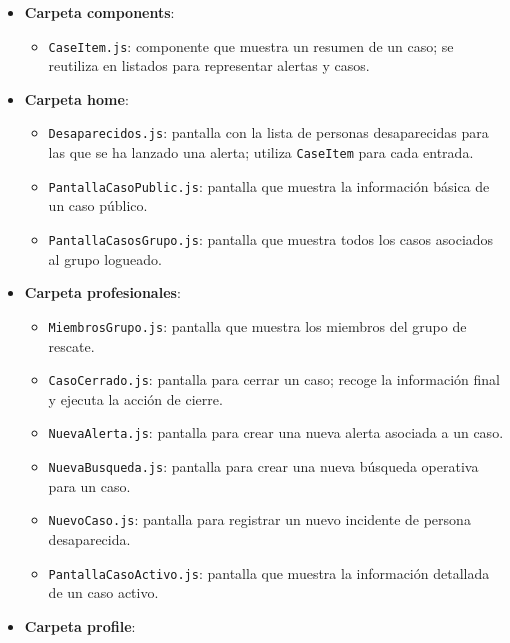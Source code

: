 \begin{itemize}
\begin{itemize}
\begin{itemize}
\begin{itemize}
\begin{itemize}
\begin{itemize}
                    \end{itemize}
                    \item \textbf{Carpeta components}:
                    \begin{itemize}
                        \item \texttt{CaseItem.js}: componente que muestra un resumen de un caso; se reutiliza en listados para representar alertas y casos.
                    \end{itemize}
                    \item \textbf{Carpeta home}:
                    \begin{itemize}
                        \item \texttt{Desaparecidos.js}: pantalla con la lista de personas desaparecidas para las que se ha lanzado una alerta; utiliza \texttt{CaseItem} para cada entrada.
                        \item \texttt{PantallaCasoPublic.js}: pantalla que muestra la información básica de un caso público.
                        \item \texttt{PantallaCasosGrupo.js}: pantalla que muestra todos los casos asociados al grupo logueado.
                    \end{itemize}
                    \item \textbf{Carpeta profesionales}:
                    \begin{itemize}
                        \item \texttt{MiembrosGrupo.js}: pantalla que muestra los miembros del grupo de rescate.
                        \item \texttt{CasoCerrado.js}: pantalla para cerrar un caso; recoge la información final y ejecuta la acción de cierre.
                        \item \texttt{NuevaAlerta.js}: pantalla para crear una nueva alerta asociada a un caso.
                        \item \texttt{NuevaBusqueda.js}: pantalla para crear una nueva búsqueda operativa para un caso.
                        \item \texttt{NuevoCaso.js}: pantalla para registrar un nuevo incidente de persona desaparecida.
                        \item \texttt{PantallaCasoActivo.js}: pantalla que muestra la información detallada de un caso activo.
                    \end{itemize}
                    \item \textbf{Carpeta profile}:

\end{itemize}
\end{itemize}
\end{itemize}
\end{itemize}
\end{itemize}
